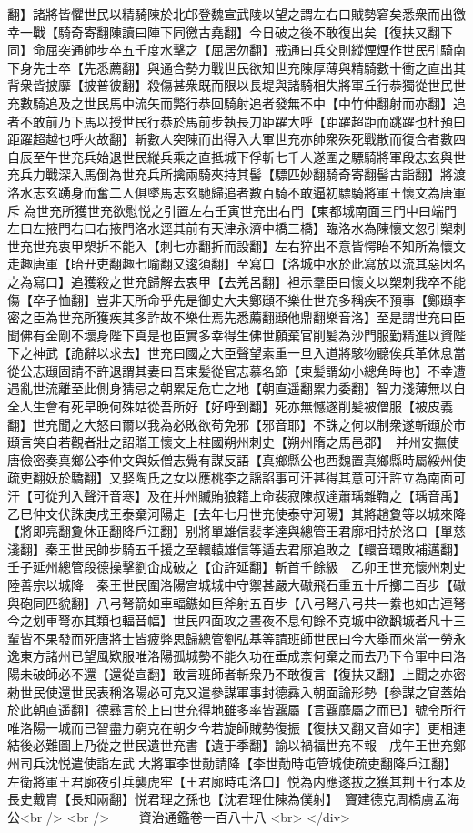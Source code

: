 翻】諸將皆懼世民以精騎陳於北邙登魏宣武陵以望之謂左右曰賊勢窘矣悉衆而出徼幸一戰【騎奇寄翻陳讀曰陣下同徼古堯翻】今日破之後不敢復出矣【復扶又翻下同】命屈突通帥步卒五千度水擊之【屈居勿翻】戒通曰兵交則縱煙煙作世民引騎南下身先士卒【先悉薦翻】與通合勢力戰世民欲知世充陳厚薄與精騎數十衝之直出其背衆皆披靡【披普彼翻】殺傷甚衆既而限以長堤與諸騎相失將軍丘行恭獨從世民世充數騎追及之世民馬中流矢而斃行恭回騎射追者發無不中【中竹仲翻射而亦翻】追者不敢前乃下馬以授世民行恭於馬前步執長刀距躍大呼【距躍超距而跳躍也杜預曰距躍超越也呼火故翻】斬數人突陳而出得入大軍世充亦帥衆殊死戰散而復合者數四自辰至午世充兵始退世民縱兵乘之直抵城下俘斬七千人遂圍之驃騎將軍段志玄與世充兵力戰深入馬倒為世充兵所擒兩騎夾持其髻【驃匹妙翻騎奇寄翻髻古詣翻】將渡洛水志玄踴身而奮二人俱墜馬志玄馳歸追者數百騎不敢逼初驃騎將軍王懷文為唐軍斥為世充所獲世充欲慰悦之引置左右壬寅世充出右門【東都城南面三門中曰端門左曰左掖門右曰右掖門洛水逕其前有天津永濟中橋三橋】臨洛水為陳懷文忽引槊刺世充世充衷甲槊折不能入【刺七亦翻折而設翻】左右猝出不意皆愕眙不知所為懷文走趣唐軍【眙丑吏翻趣七喻翻又逡須翻】至寫口【洛城中水於此寫放以流其惡因名之為寫口】追獲殺之世充歸解去衷甲【去羌呂翻】袒示羣臣曰懷文以槊刺我卒不能傷【卒子恤翻】豈非天所命乎先是御史大夫鄭頲不樂仕世充多稱疾不預事【鄭頲李密之臣為世充所獲疾其多詐故不樂仕焉先悉薦翻頲他鼎翻樂音洛】至是謂世充曰臣聞佛有金剛不壞身陛下真是也臣實多幸得生佛世願棄官削髪為沙門服勤精進以資陛下之神武【詭辭以求去】世充曰國之大臣聲望素重一旦入道將駭物聽俟兵革休息當從公志頲固請不許退謂其妻曰吾束髪從官志慕名節【束髪謂幼小總角時也】不幸遭遇亂世流離至此側身猜忌之朝累足危亡之地【朝直遥翻累力委翻】智力淺薄無以自全人生會有死早晩何殊姑從吾所好【好呼到翻】死亦無憾遂削髪被僧服【被皮義翻】世充聞之大怒曰爾以我為必敗欲苟免邪【邪音耶】不誅之何以制衆遂斬頲於市頲言笑自若觀者壯之詔贈王懷文上柱國朔州刺史【朔州隋之馬邑郡】　并州安撫使唐儉密奏真鄉公李仲文與妖僧志覺有謀反語【真鄉縣公也西魏置真鄉縣時屬綏州使疏吏翻妖於驕翻】又娶陶氏之女以應桃李之謡諂事可汗甚得其意可汗許立為南面可汗【可從刋入聲汗音寒】及在并州贓賄狼籍上命裴寂陳叔達蕭瑀雜鞫之【瑀音禹】乙巳仲文伏誅庚戌王泰棄河陽走【去年七月世充使泰守河陽】其將趙夐等以城來降【將即亮翻夐休正翻降戶江翻】别將單雄信裴孝達與總管王君廓相持於洛口【單慈淺翻】秦王世民帥步騎五千援之至轘轅雄信等遁去君廓追敗之【轘音環敗補邁翻】壬子延州總管段德操擊劉仚成破之【仚許延翻】斬首千餘級　乙卯王世充懷州刺史陸善宗以城降　秦王世民圍洛陽宫城城中守禦甚嚴大礮飛石重五十斤擲二百步【礮與砲同匹貌翻】八弓弩箭如車輻鏃如巨斧射五百步【八弓弩八弓共一絭也如古連弩今之划車弩亦其類也輻音幅】世民四面攻之晝夜不息旬餘不克城中欲飜城者凡十三輩皆不果發而死唐將士皆疲弊思歸總管劉弘基等請班師世民曰今大舉而來當一勞永逸東方諸州已望風欵服唯洛陽孤城勢不能久功在垂成柰何棄之而去乃下令軍中曰洛陽未破師必不還【還從宣翻】敢言班師者斬衆乃不敢復言【復扶又翻】上聞之亦密勑世民使還世民表稱洛陽必可克又遣參謀軍事封德彞入朝面論形勢【參謀之官蓋始於此朝直遥翻】德彞言於上曰世充得地雖多率皆覊屬【言覊靡屬之而已】號令所行唯洛陽一城而已智盡力窮克在朝夕今若旋師賊勢復振【復扶又翻又音如字】更相連結後必難圖上乃從之世民遺世充書【遺于季翻】諭以禍福世充不報　戊午王世充鄭州司兵沈悦遣使詣左武大將軍李世勣請降【李世勣時屯管城使疏吏翻降戶江翻】左衛將軍王君廓夜引兵襲虎牢【王君廓時屯洛口】悦為内應遂拔之獲其荆王行本及長史戴胄【長知兩翻】悦君理之孫也【沈君理仕陳為僕射】　竇建德克周橋虜孟海公<br />
<br />
　　資治通鑑卷一百八十八  <br>
   </div> 

